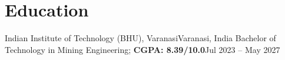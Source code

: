 \section{Education}
  \resumeSubHeadingListStart
    \resumeSubheading
      {Indian Institute of Technology (BHU), Varanasi}{Varanasi, India}
      {Bachelor of Technology in Mining Engineering; \textbf{CGPA: 8.39/10.0}}{Jul 2023 -- May 2027}
  \resumeSubHeadingListEnd
